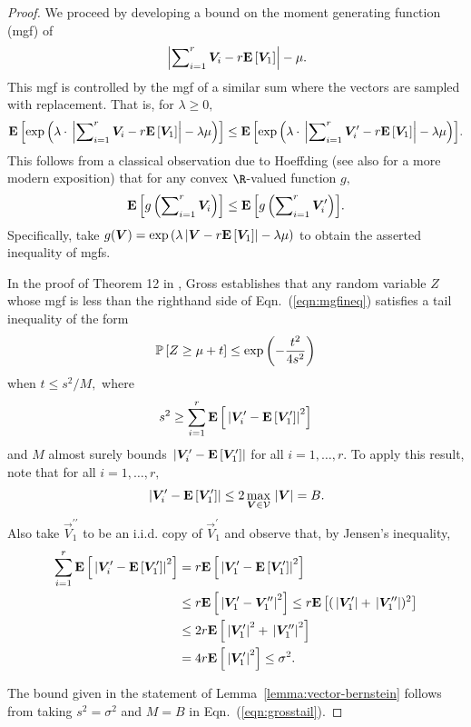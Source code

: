 \begin{proof}
 We proceed by developing a bound on the moment generating function (mgf) of
\[
\mbox{}\left|\sum\nolimits_{i=1}^r \bm{V}_i - r{{\mathbf E}\left[\bm{V}_1\right]}\right| - \mu.
\]
This mgf is controlled by the mgf of a similar sum where the vectors are sampled with replacement. That is, for $\lambda \geq 0,$
\begin{equation}
\label{eqn:mgfineq}
 \E{\mathrm{exp}\left(\lambda \cdot \VTNorm{\sum\nolimits_{i=1}^r \vec{V}_i - r\E{\vec{V}_1}} - \lambda \mu\right)} \leq
\E{\mathrm{exp}\left(\lambda \cdot \VTNorm{\sum\nolimits_{i=1}^r \vec{V}_i^\prime - r\E{\vec{V}_1}} - \lambda \mu\right)}.
\end{equation}
This follows from a classical observation due to Hoeffding \cite{Hoe63} (see also \cite{GN10} for a more modern exposition) that for any convex $\R$-valued function $g,$
\[
 {{\mathbf E}\left[g\left( \sum\nolimits_{i=1}^r \bm{V}_i \right)\right]}\leq {{\mathbf E}\left[g\left(\sum\nolimits_{i=1}^r \ensuremath{\bm{V}}_i^\prime \right)\right]}.
\]
Specifically, take $g(\bm{V}) = \mathrm{exp}\left(\lambda\mbox{}\left|\bm{V} - r {{\mathbf E}\left[\bm{V}_1\right]}\right| - \lambda \mu\right)$ to obtain the asserted inequality of mgfs.

In the proof of Theorem 12 in \cite{Gross11}, Gross establishes that any random variable $Z$ whose mgf is less than the righthand side of Eqn.~(\ref{eqn:mgfineq}) satisfies a tail inequality of the form
\begin{equation}
\label{eqn:grosstail}
 \Probab{ Z \geq \mu + t } \leq \mathrm{exp}\left( -\frac{t^2}{4s^2} \right)
\end{equation}
when $t \leq s^2/M,$ where
\[
s^2 \geq \sum_{i=1}^r {{\mathbf E}\left[\mbox{}\left|\bm{V}_i^\prime - {{\mathbf E}\left[\bm{V}_1^\prime\right]} \right|^2\right]}
\]
and $M$ almost surely bounds $\mbox{}\left|\bm{V}_i^\prime - {{\mathbf E}\left[\bm{V}_1^\prime\right]}\right|$ for all $i=1,\ldots,r.$
 To apply this result, note that for all $i=1,\ldots,r,$
 \[
  \mbox{}\left|\bm{V}_i^\prime - {{\mathbf E}\left[\bm{V}_1^\prime\right]}\right| \leq 2 \max_{\bm{V} \in \mathcal{V}} \mbox{}\left|\bm{V}\right| = B.
 \]
Also take $\vec{V}_1^{\prime\prime}$ to be an i.i.d. copy of $\vec{V}_1^\prime$ and observe that, by Jensen's inequality,
 \begin{align*}
  \sum_{i=1}^r {{\mathbf E}\left[\mbox{}\left|\bm{V}_i^\prime - {{\mathbf E}\left[\bm{V}_1^\prime\right]} \right|^2\right]} & = r {{\mathbf E}\left[\mbox{}\left|\bm{V}_1^\prime - {{\mathbf E}\left[\bm{V}_1^\prime\right]} \right|^2\right]} \\
  & \leq r {{\mathbf E}\left[\mbox{}\left|\bm{V}_1^\prime - \bm{V}_1^{\prime\prime}\right|^2 \right]} \leq r {{\mathbf E}\left[ (\mbox{}\left|\bm{V}_1^\prime\right| + \mbox{}\left|\bm{V}_1^{\prime \prime}\right|)^2\right]} \\
  & \leq 2 r {{\mathbf E}\left[ \mbox{}\left|\bm{V}_1^\prime\right|^2 + \mbox{}\left|\bm{V}_1^{\prime\prime}\right|^2 \right]} \\
  & = 4 r {{\mathbf E}\left[ \mbox{}\left|\bm{V}_1^\prime\right|^2 \right]} \leq \sigma^2.
 \end{align*}

The bound given in the statement of Lemma~\ref{lemma:vector-bernstein} follows from taking $s^2 = \sigma^2$ and $M = B$ in Eqn.~(\ref{eqn:grosstail}).
\end{proof}

